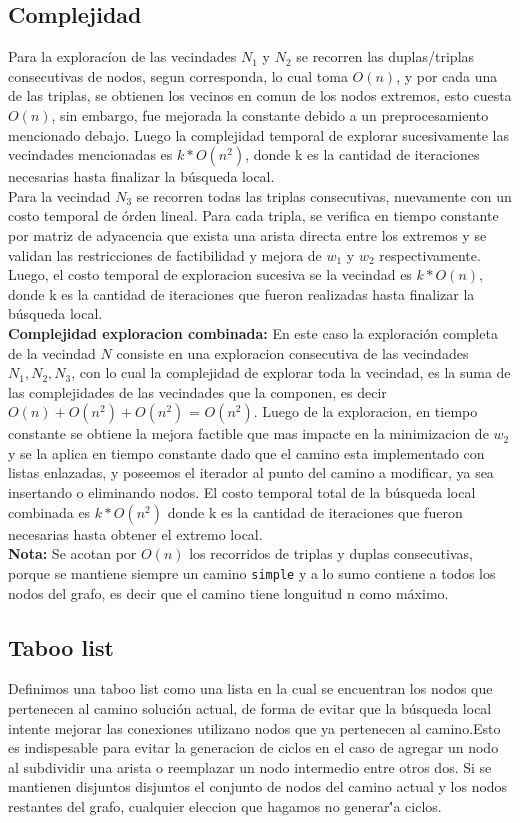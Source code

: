 \subsection{Complejidad}
Para la explorac\'ion de las vecindades $N_1$ y $N_2$ se recorren las duplas/triplas consecutivas de nodos, segun corresponda, lo cual toma $O(n)$, y por cada una de las triplas, se obtienen los vecinos en comun de los nodos extremos, esto cuesta $O(n)$, sin embargo, fue mejorada la constante debido a un preprocesamiento mencionado debajo. Luego la complejidad temporal de explorar sucesivamente las vecindades mencionadas es $k*O(n^2)$, donde k es la cantidad de iteraciones necesarias hasta finalizar la b\'usqueda local.\\
Para la vecindad $N_3$ se recorren todas las triplas consecutivas, nuevamente con un costo temporal de \'orden lineal. Para cada tripla, se verifica en tiempo constante por matriz de adyacencia que exista una arista directa entre los extremos y se validan las restricciones de factibilidad y mejora de $w_1$ y $w_2$ respectivamente. Luego, el costo temporal de exploracion sucesiva se la vecindad es $k*O(n)$, donde k es la cantidad de iteraciones que fueron realizadas hasta finalizar la b\'usqueda local.\\

\textbf{Complejidad exploracion combinada:} En este caso la exploraci\'on completa de la vecindad $N$ consiste en una exploracion consecutiva de las vecindades $N_1, N_2, N_3$, con lo cual la complejidad de explorar toda la vecindad, es la suma de las complejidades de las vecindades que la componen, es decir $O(n) + O(n^2) + O(n^2) $ = $ O(n^2)$. Luego de la exploracion, en tiempo constante se obtiene la mejora factible que mas impacte en la minimizacion de $w_2$ y se la aplica en tiempo constante dado que el camino esta implementado con listas enlazadas, y poseemos el iterador al punto del camino a modificar, ya sea insertando o eliminando nodos. El costo temporal total de la b\'usqueda local combinada es $k*O(n^2)$ donde k es la cantidad de iteraciones que fueron necesarias hasta obtener el extremo local.\\

\textbf{Nota:} Se acotan por $O(n)$ los recorridos de triplas y duplas consecutivas, porque se mantiene siempre un camino \texttt{simple} y a lo sumo contiene a todos los nodos del grafo, es decir que el camino tiene longuitud n como m\'aximo. 

\subsection{Taboo list}
  Definimos una taboo list como una lista en la cual se encuentran los nodos que pertenecen al camino soluci\'on actual, de forma de evitar que la b\'usqueda local intente mejorar las conexiones utilizano nodos que ya pertenecen al camino.Esto es indispesable para evitar la generacion de ciclos en el caso de agregar un nodo al subdividir una arista o reemplazar un nodo
intermedio entre otros dos. Si se mantienen disjuntos disjuntos el conjunto de nodos del camino actual y los nodos restantes del grafo, cualquier eleccion que hagamos no generar\''a ciclos.

